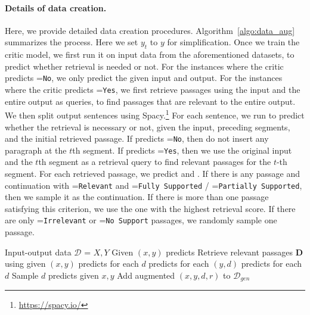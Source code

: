 \paragraph{Details of \mgen data creation.}
 Here, we provide detailed data creation procedures. 
Algorithm~\ref{algo:data_aug} summarizes the process. 
Here we set $y_t$ to $y$ for simplification.   
Once we train the critic model, we first run it on input data from the aforementioned datasets, to predict whether retrieval is needed or not. For the instances where the critic predicts \ret=\texttt{No}, we only predict the \cuse given input and output. For the instances where the critic predicts \ret=\texttt{Yes}, we first retrieve passages using the input and the entire output as queries, to find passages that are relevant to the entire output. We then split output sentences using Spacy.\footnote{\url{https://spacy.io/}} 
For each sentence, we run \mcrt to predict whether the retrieval is necessary or not, given the input, preceding segments, and the initial retrieved passage.  
If \mcrt predicts \ret=\texttt{No}, then do not insert any paragraph at the $t$th segment. 
If \mcrt predicts \ret=\texttt{Yes}, then we use the original input and the $t$th segment as a retrieval query to find relevant passages for the $t$-th segment. For each retrieved passage, we predict \crel and \cgr. 
If there is any passage and continuation with \crel=\texttt{Relevant} and \cgr=\texttt{Fully Supported} / \cgr=\texttt{Partially Supported}, then we sample it as the continuation. If there is more than one passage satisfying this criterion, we use the one with the highest retrieval score. 
If there are only \crel=\texttt{Irrelevant} or \cgr=\texttt{No Support} passages, we randomly sample one passage. 

\begin{algorithm}
\caption{$\mathcal{M}_{gen}$ Data creation}\label{algo:data_aug}
\begin{algorithmic}[1]
  Input-output data $\mathcal{D}$ = ${X, Y}$
\State Given $(x,y)$ \mcrt predicts \ret
{}
    \State Retrieve relevant passages $\mathbf{D}$ using \mret given $(x,y)$
    \Comment{\textcolor{blue}{Retrieve passages} }
    \State \mcrt predicts \crel for each $d$     \Comment{\textcolor{blue}{Predict relevance of passages} }
     \State \mcrt predicts \cgr for each $(y, d)$ \Comment{\textcolor{blue}{Predict supports of outputs} }
    \EndFor
    \State\mcrt predicts \cuse for each $d$ 
    \State Sample $d$
    \State \mcrt predicts \cuse given $x, y$
\EndIf
Add augmented $(x, y, d, r)$ to $\mathcal{D}_{gen}$
\EndFor
\end{algorithmic}
\end{algorithm}

